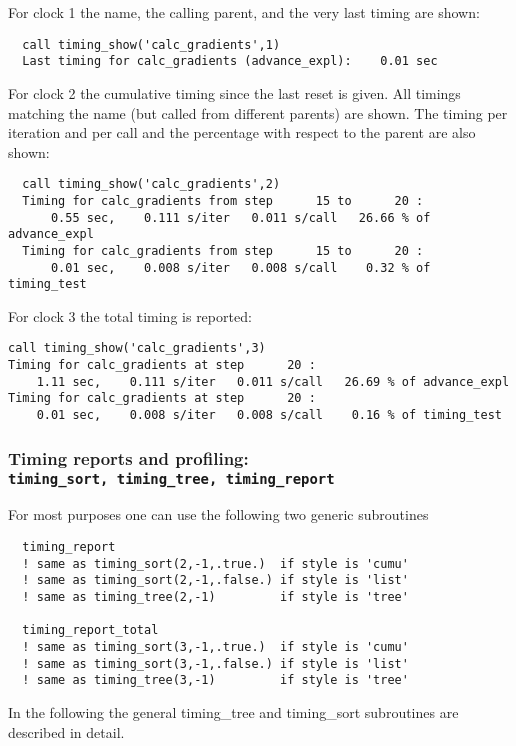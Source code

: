 For clock 1 the name, the calling parent, and the very last timing are shown:
\begin{verbatim}
  call timing_show('calc_gradients',1)
  Last timing for calc_gradients (advance_expl):    0.01 sec
\end{verbatim}
For clock 2 the cumulative timing since the last reset is given.
All timings matching the name (but called from different parents) are shown.
The timing per iteration and per call and the percentage
with respect to the parent are also shown:
{\small
\begin{verbatim}
  call timing_show('calc_gradients',2)
  Timing for calc_gradients from step      15 to      20 :
      0.55 sec,    0.111 s/iter   0.011 s/call   26.66 % of advance_expl
  Timing for calc_gradients from step      15 to      20 :
      0.01 sec,    0.008 s/iter   0.008 s/call    0.32 % of timing_test
\end{verbatim}
}
For clock 3 the total timing is reported:
{\small
\begin{verbatim}
call timing_show('calc_gradients',3)
Timing for calc_gradients at step      20 :
    1.11 sec,    0.111 s/iter   0.011 s/call   26.69 % of advance_expl
Timing for calc_gradients at step      20 :
    0.01 sec,    0.008 s/iter   0.008 s/call    0.16 % of timing_test
\end{verbatim}
}

\subsubsection{Timing reports and profiling: \\
      {\tt timing\_sort, timing\_tree, timing\_report}}

For most purposes one can use the following two generic subroutines
\begin{verbatim}
  timing_report  
  ! same as timing_sort(2,-1,.true.)  if style is 'cumu'
  ! same as timing_sort(2,-1,.false.) if style is 'list'
  ! same as timing_tree(2,-1)         if style is 'tree'

  timing_report_total
  ! same as timing_sort(3,-1,.true.)  if style is 'cumu'
  ! same as timing_sort(3,-1,.false.) if style is 'list'
  ! same as timing_tree(3,-1)         if style is 'tree'
\end{verbatim}
In the following the general timing\_tree and timing\_sort
subroutines are described in detail. 

